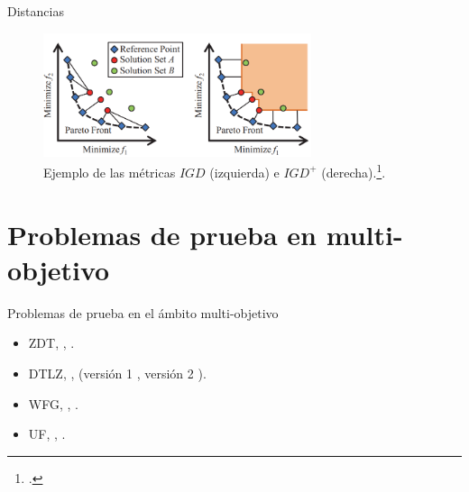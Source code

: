 \documentclass{beamer}
\begin{document}
\begin{frame}{Distancias}

\begin{table}[]
\end{table}
\begin{figure}[H]
\centering
\includegraphics[width=0.7\textwidth]{igd.png}
\caption{\scriptsize Ejemplo de las métricas $IGD$ (izquierda) e $IGD^+$ (derecha).\footcite{ishibuchi2016sensitivity}.}
\end{figure}
\end{frame}



\section{Problemas de prueba en multi-objetivo}
\begin{frame}{Problemas de prueba en el ámbito multi-objetivo}
\begin{itemize}
   \item ZDT, \citeauthor{Joel:ZDT}, \citeyear{Joel:ZDT}.%
   \item DTLZ, \citeauthor{Joel:DTLZ_1}, (versión 1 \citeyear{Joel:DTLZ_1}, versión 2 \citeyear{Joel:DTLZ_2}).%
   \item WFG, \citeauthor{Joel:WFG_Main}, \citeyear{Joel:WFG_Main}.%
   \item UF, \citeauthor{Joel:CEC2009}, \citeyear{Joel:CEC2009}.%
\end{itemize}
\end{frame}
\end{document}
